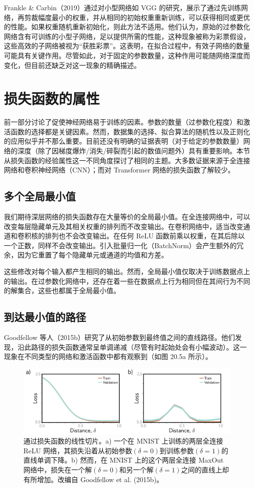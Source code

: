 Frankle \& Carbin（2019）通过对小型网络如 VGG 的研究，展示了通过先训练网络，再剪裁幅度最小的权重，并从相同的初始权重重新训练，可以获得相同或更优的性能。如果权重随机重新初始化，则此方法不适用。他们认为，原始的过参数化网络含有可训练的小型子网络，足以提供所需的性能，这种现象被称为彩票假设，这些高效的子网络被视为“获胜彩票”。这表明，在拟合过程中，有效子网络的数量可能具有关键作用。尽管如此，对于固定的参数数量，这种作用可能随网络深度而变化，但目前还缺乏对这一现象的精确描述。

\section{损失函数的属性}
前一部分讨论了促使神经网络易于训练的因素。参数的数量（过参数化程度）和激活函数的选择都是关键因素。然而，数据集的选择、拟合算法的随机性以及正则化的应用似乎并不那么重要。目前还没有明确的证据表明（对于给定的参数数量）网络的深度（除了因梯度爆炸/消失/碎裂而引起的数值问题外）具有重要影响。本节从损失函数的经验属性这一不同角度探讨了相同的主题。大多数证据来源于全连接网络和卷积神经网络（CNN）；而对 Transformer 网络的损失函数了解较少。

\subsection{多个全局最小值}
我们期待深层网络的损失函数存在大量等价的全局最小值。在全连接网络中，可以改变每层隐藏单元及其相关权重的排列而不改变输出。在卷积网络中，适当改变通道和卷积核的排列也不会改变输出。在任何 ReLU 函数前乘以权重，在其后除以一个正数，同样不会改变输出。引入批量归一化（BatchNorm）会产生额外的冗余，因为它重置了每个隐藏单元或通道的均值和方差。

这些修改对每个输入都产生相同的输出。然而，全局最小值仅取决于训练数据点上的输出。在过参数化网络中，还存在着一些在数据点上行为相同但在其间行为不同的解集合，这些也都属于全局最小值。

\subsection{到达最小值的路径}
Goodfellow 等人（2015b）研究了从初始参数到最终值之间的直线路径。他们发现，沿此路径的损失函数通常呈单调递减（尽管有时起始处会有小幅波动）。这一现象在不同类型的网络和激活函数中都有观察到（如图 20.5a 所示）。

\begin{figure}[ht!]
\centering
\includegraphics[width=0.7\linewidth]{png/chapter20/WhyGoodFellowRoute.png}
\caption{通过损失函数的线性切片。a) 一个在 MNIST 上训练的两层全连接 ReLU 网络，其损失沿着从初始参数\((\delta=0)\)到训练参数\((\delta=1)\)的直线单调下降。b) 然而，在 MNIST 上的这个两层全连接 MaxOut 网络中，损失在一个解\((\delta=0)\)和另一个解\((\delta=1)\)之间的直线上却有所增加。改编自 Goodfellow et al. (2015b)。}
\end{figure}

